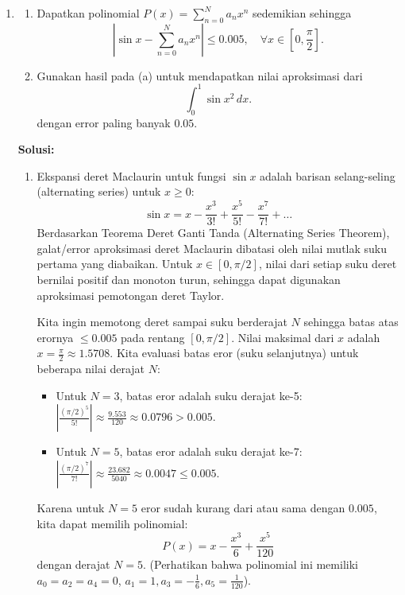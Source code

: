 \documentclass[12pt]{article}
\begin{document}
\begin{enumerate}
      \item
            \begin{enumerate}
                  \item Dapatkan polinomial $P(x) = \sum_{n=0}^N a_n x^n$ sedemikian sehingga
                        $$ \left| \sin x - \sum_{n=0}^N a_n x^n \right| \le 0.005, \quad \forall x \in \left[0, \frac{\pi}{2}\right]. $$
                  \item Gunakan hasil pada (a) untuk mendapatkan nilai aproksimasi dari
                        $$ \int_0^1 \sin x^2 \, dx. $$
                        dengan error paling banyak $0.05$.
            \end{enumerate}

            \textbf{Solusi:}
            \begin{enumerate}
                  \item Ekspansi deret Maclaurin untuk fungsi $\sin x$ adalah barisan selang-seling (alternating series) untuk $x \ge 0$:
                        $$ \sin x = x - \frac{x^3}{3!} + \frac{x^5}{5!} - \frac{x^7}{7!} + \dots $$
                        Berdasarkan Teorema Deret Ganti Tanda (Alternating Series Theorem), galat/error aproksimasi deret Maclaurin dibatasi oleh nilai mutlak suku pertama yang diabaikan. Untuk $x \in [0, \pi/2]$, nilai dari setiap suku deret bernilai positif dan monoton turun, sehingga dapat digunakan aproksimasi pemotongan deret Taylor.

                        Kita ingin memotong deret sampai suku berderajat $N$ sehingga batas atas erornya $\le 0.005$ pada rentang $[0, \pi/2]$.
                        Nilai maksimal dari $x$ adalah $x = \frac{\pi}{2} \approx 1.5708$. Kita evaluasi batas eror (suku selanjutnya) untuk beberapa nilai derajat $N$:
                        \begin{itemize}
                              \item Untuk $N=3$, batas eror adalah suku derajat ke-5: $\left| \frac{(\pi/2)^5}{5!} \right| \approx \frac{9.553}{120} \approx 0.0796 > 0.005$.
                              \item Untuk $N=5$, batas eror adalah suku derajat ke-7: $\left| \frac{(\pi/2)^7}{7!} \right| \approx \frac{23.682}{5040} \approx 0.0047 \le 0.005$.
                        \end{itemize}
                        Karena untuk $N=5$ eror sudah kurang dari atau sama dengan $0.005$, kita dapat memilih polinomial:
                        $$ P(x) = x - \frac{x^3}{6} + \frac{x^5}{120} $$
                        dengan derajat $N=5$. (Perhatikan bahwa polinomial ini memiliki $a_0 = a_2 = a_4 = 0$, $a_1 = 1, a_3 = -\frac{1}{6}, a_5 = \frac{1}{120}$).


\end{enumerate}
\end{enumerate}
\end{document}
